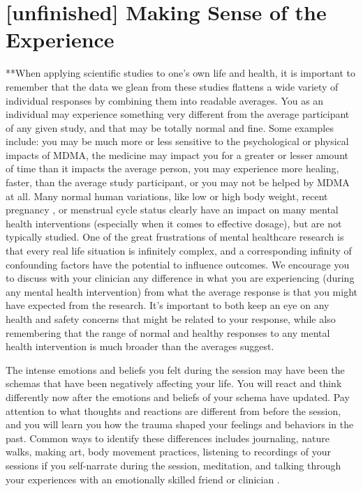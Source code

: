 \documentclass[12pt,letterpaper]{book}
\begin{document}
\section{[unfinished] Making Sense of the Experience}
\label{sectionMakingSense}
**When applying scientific studies to one's own life and health, it is important to remember that the data we glean from these studies flattens a wide variety of individual responses by combining them into readable averages. You as an individual may experience something very different from the average participant of any given study, and that may be totally normal and fine. Some examples include: you may be much more or less sensitive to the psychological or physical impacts of MDMA, the medicine may impact you for a greater or lesser amount of time than it impacts the average person, you may experience more healing, faster, than the average study participant, or you may not be helped by MDMA at all. Many normal human variations, like low or high body weight, recent pregnancy , or menstrual cycle status  clearly have an impact on many mental health interventions (especially when it comes to effective dosage), but are not typically studied. One of the great frustrations of mental healthcare research is that every real life situation is infinitely complex, and a corresponding infinity of confounding factors have the potential to influence outcomes. We encourage you to discuss with your clinician any difference in what you are experiencing (during any mental health intervention) from what the average response is that you might have expected from the research. It's important to both keep an eye on any health and safety concerns that might be related to your response, while also remembering that the range of normal and healthy responses to any mental health intervention is much broader than the averages suggest.

The intense emotions and beliefs you felt during the session may have been the schemas that have been negatively affecting your life. You will react and think differently now after the emotions and beliefs of your schema have updated. Pay attention to what thoughts and reactions are different from before the session, and you will learn you how the trauma shaped your feelings and behaviors in the past. Common ways to identify these differences includes journaling, nature walks, making art, body movement practices, listening to recordings of your sessions if you self-narrate during the session, meditation, and talking through your experiences with an emotionally skilled friend or clinician \cite{mithoeferManual}.
\end{document}
